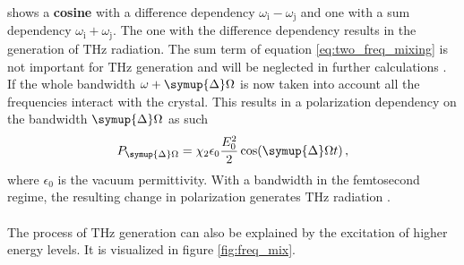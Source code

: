 shows a \textbf{cosine} with a difference dependency $\omega_\text{i}-\omega_\text{j}$ and one with a sum dependency $\omega_\text{i}+\omega_\text{j}$.
The one with the difference dependency results in the generation of $\si{\tera\hertz}$ radiation. %
The sum term of equation \eqref{eq:two_freq_mixing} is not important for $\si{\tera\hertz}$ generation and will be neglected in further calculations \cite{wiki_book}.
If the whole bandwidth $\omega + \symup{\Delta}\Omega$ is now taken into account all the frequencies interact with the crystal.
This results in a polarization dependency on the bandwidth $\symup{\Delta}\Omega$ as such
\begin{equation}
    P_{\symup{\Delta}\Omega} = \chi_2 \epsilon_0 \frac{E_0^2}{2}\cos(\symup{\Delta}\Omega t) \, ,
    \label{eq:polarization_depens}
\end{equation}
where $\epsilon_0$ is the vacuum permittivity.
With a bandwidth in the femtosecond regime, the resulting change in polarization generates $\si{\tera\hertz}$ radiation \cite{book_optical_rectification}\cite{wiki_book}.
\\\\
The process of $\si{\tera\hertz}$ generation can also be explained by the excitation of higher energy levels.
It is visualized in figure \ref{fig:freq_mix}.
